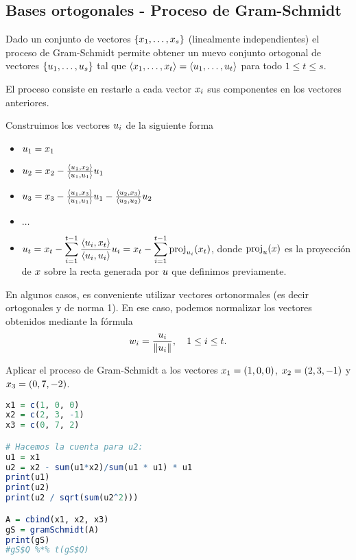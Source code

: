 \subsection{Bases ortogonales - Proceso de Gram-Schmidt}

Dado un conjunto de vectores $\{\xb_1, \dots, \xb_s\}$ (linealmente independientes) el proceso de Gram-Schmidt permite obtener un nuevo conjunto ortogonal de vectores $\{\ub_1, \dots, \ub_s\}$ tal que $\langle \xb_1, \dots, \xb_t\rangle = \langle \ub_1, \dots, \ub_t\rangle$ para todo $1 \le t \le s$.

El proceso consiste en restarle a cada vector $\xb_i$ sus componentes en los vectores anteriores.

Construimos los vectores $\ub_i$ de la siguiente forma
\begin{itemize}
\item   $\ub_1 = \xb_1$
\item   $\ub_2 = \xb_2 - \frac{\langle \ub_1, \xb_2 \rangle}{\langle \ub_1, \ub_1 \rangle} \ub_1$
\item   $\ub_3 = \xb_3 - \frac{\langle \ub_1, \xb_3 \rangle}{\langle \ub_1, \ub_1\rangle} \ub_1 - \frac{\langle \ub_2, \xb_3 \rangle}{\langle \ub_2, \ub_2 \rangle} \ub_2$
\item   $\dots$
\item $\displaystyle{\ub_t = \xb_t - \sum_{i = 1}^{t-1} \frac{\langle \ub_i, \xb_t \rangle}{\langle \ub_i, \ub_i\rangle} \ub_i = \xb_t - \sum_{i = 1}^{t-1} \proj_{\ub_i}(\xb_t)}$, donde $\proj_{\ub}(\xb)$ es la proyección de $\xb$ sobre la recta generada por $\ub$ que definimos previamente.
\end{itemize}

En algunos casos, es conveniente utilizar vectores ortonormales (es decir ortogonales y de norma 1). En ese caso, podemos normalizar los vectores obtenidos mediante la fórmula
$$\wb_i = \frac{\ub_i}{\|\ub_i\|}, \quad 1 \le i \le t.$$

\begin{ejercicio}
Aplicar el proceso de Gram-Schmidt a los vectores $\xb_1 = (1, 0, 0)$, $\xb_2 = (2, 3, -1)$ y $\xb_3=(0, 7, -2)$.

\begin{lstlisting}[language=R]
x1 = c(1, 0, 0)
x2 = c(2, 3, -1)
x3 = c(0, 7, 2)

# Hacemos la cuenta para u2:
u1 = x1
u2 = x2 - sum(u1*x2)/sum(u1 * u1) * u1
print(u1)
print(u2)
print(u2 / sqrt(sum(u2^2)))

A = cbind(x1, x2, x3)
gS = gramSchmidt(A)
print(gS)
#gS$Q %*% t(gS$Q)
\end{lstlisting}
\end{ejercicio}


